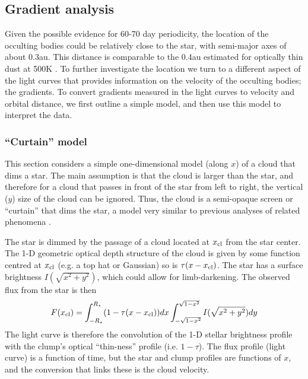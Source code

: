 \documentclass[useAMS,usenatbib,usegraphicx]{mn2e}
\begin{document}
\subsection{Gradient analysis}\label{ss:grad}

Given the possible evidence for 60-70 day periodicity, the location of the occulting
bodies could be relatively close to the star, with semi-major axes of about 0.3au. This
distance is comparable to the 0.4au estimated for optically thin dust at 500K
\citep{2013A&A...553L...1D}. To further investigate the location we turn to a different
aspect of the light curves that provides information on the velocity of the occulting
bodies; the gradients. To convert gradients measured in the light curves to velocity and
orbital distance, we first outline a simple model, and then use this model to interpret
the data.

\subsubsection{``Curtain'' model}\label{sss:curtain}

This section considers a simple one-dimensional model (along $x$) of a cloud that dims a
star. The main assumption is that the cloud is larger than the star, and therefore for a
cloud that passes in front of the star from left to right, the vertical ($y$) size of the
cloud can be ignored. Thus, the cloud is a semi-opaque screen or ``curtain'' that dims
the star, a model very similar to previous analyses of related phenomena
\citep[e.g. KH-15D,
J1407,][]{2006ApJ...644..510W,2014MNRAS.441.2845V,2015ApJ...800..126K}.

The star is dimmed by the passage of a cloud located at $x_{\rm cl}$ from the star
center. The 1-D geometric optical depth structure of the cloud is given by some function
centred at $x_{\rm cl}$ (e.g. a top hat or Gaussian) so is $\tau(x-x_{\rm cl})$. The star
has a surface brightness $I(\sqrt{x^2+y^2})$, which could allow for limb-darkening. The
observed flux from the star is then
\begin{equation}\label{eq:f}
  F(x_{\rm cl}) = \int_{-R_\star}^{R_\star} (1-\tau(x-x_{\rm cl})) dx \int_{-\sqrt{1-x^2}}^{\sqrt{1-x^2}} I(\sqrt{x^2+y^2}) dy
\end{equation}
The light curve is therefore the convolution of the 1-D stellar brightness profile with
the clump's optical ``thin-ness'' profile (i.e. $1-\tau$). The flux profile (light curve)
is a function of time, but the star and clump profiles are functions of $x$, and the
conversion that links these is the cloud velocity.
\end{document}

